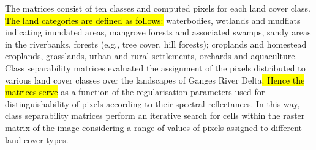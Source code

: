 \documentclass[water,article,submit,pdftex,moreauthors]{Definitions/mdpi}
\begin{document}
The matrices consist\hl{ }of ten classes and computed pixels for each land cover class. \hl{The land categories are defined as follows: } waterbodies, wetlands and mudflats indicating inundated areas,  mangrove forests and associated swamps, sandy areas in the riverbanks, forests (e.g., tree cover, hill forests); croplands and homestead croplands, grasslands, urban and rural settlements, orchards and aquaculture. Class separability matrices evaluated the assignment of the pixels distributed to various land cover classes over the landscapes of Ganges River Delta\hl{. Hence the matrices serve} as a function of the regularisation parameters used for distinguishability of pixels according to their spectral reflectances. In this way, class separability matrices perform an iterative search for cells within the raster matrix of the image considering a range of values of pixels assigned to different land cover types.
\end{document}

